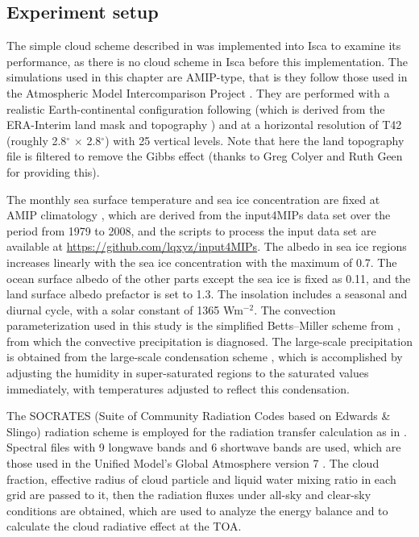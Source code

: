 \subsection{Experiment setup}
\label{sec:eval_cld_exp_setup}
The simple cloud scheme described in  was implemented into Isca \citep{Vallis2018} to examine its performance, as there is no cloud scheme in Isca before this implementation. The simulations used in this chapter are AMIP-type, that is they follow those used in the Atmospheric Model Intercomparison Project . They are performed with a realistic Earth-continental configuration following \citet{Thomson2018} (which is derived from the ERA-Interim land mask and topography \citep{Dee2011}) and at a horizontal resolution of T42 (roughly 2.8$^\circ$ $\times$ 2.8$^\circ$) with 25 vertical levels. Note that here the land topography file is filtered to remove the Gibbs effect (thanks to Greg Colyer and Ruth Geen for providing this).

The monthly sea surface temperature and sea ice concentration are fixed at AMIP climatology \citep{Taylor2000sea}, which are derived from the input4MIPs data set \citep{Durack2018} over the period from 1979 to 2008, and the scripts to process the input data set are available at \url{https://github.com/lqxyz/input4MIPs}. The albedo in sea ice regions increases linearly with the sea ice concentration with the maximum of 0.7. The ocean surface albedo of the other parts except the sea ice is fixed as 0.11, and the land surface albedo prefactor is set to 1.3. The insolation includes a seasonal and diurnal cycle, with a solar constant  of 1365 Wm$^{-2}$. The convection parameterization used in this study is the simplified Betts--Miller scheme from \citet{Frierson2007}, from which the convective precipitation is diagnosed. The large-scale precipitation is obtained from the large-scale condensation scheme \citep{Frierson2007}, which is accomplished by adjusting the humidity in super-saturated regions to the saturated values immediately, with temperatures adjusted to reflect this condensation. 

The SOCRATES (Suite of Community Radiation Codes based on Edwards \& Slingo) radiation scheme  \citep{Edwards1996, Manners2015} is employed for the radiation transfer calculation as in \citet{Thomson2019}. Spectral files with 9 longwave bands and 6 shortwave bands are used, which are those used in the Unified Model's Global Atmosphere version 7 \citep{Walters2019}. The cloud fraction, effective radius of cloud particle and liquid water mixing ratio in each grid are passed to it, then the radiation fluxes under all-sky and clear-sky conditions are obtained, which are used to analyze the energy balance and to calculate the cloud radiative effect \citep{Ramanathan1989, Li2017} at the TOA.

